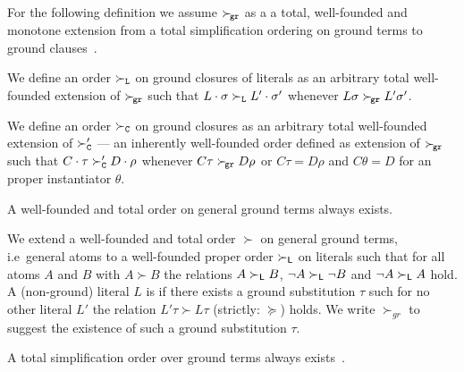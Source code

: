For the following definition we assume
\( \mathrel\succ_{\!\mathtt{gr}} \) as a a total, well-founded and monotone extension
from a total simplification ordering on ground terms
to ground clauses~\cite{NR2001}.

\begin{definition}
    We define an order \( \mathrel\succ_{\mathtt{L}} \) on ground closures of literals
    as an arbitrary total well-founded extension of \( \mathrel\succ_{\!\mathtt{gr}} \)
    such that
   \( L\cdot\sigma\mathrel\succ_{\mathtt{L}} L'\cdot\sigma' \) whenever
   \( L\sigma\mathrel\succ_{\!\mathtt{gr}} L'\sigma' \).

    We define an order \( \mathrel\succ_{\mathtt{C}} \) on ground closures
    as an arbitrary total well-founded extension of
   \( \mathrel\succ_{\mathtt{C}}' \) --- an inherently well-founded order defined as extension of \( \mathrel\succ_{\!\mathtt{gr}} \)
    such that
   \( C\cdot\tau\mathrel\succ_{\mathtt{C}}' D\cdot\rho \) whenever
   \( C\tau\mathrel\succ_{\!\mathtt{gr}} D\rho \) or \( C\tau = D\rho \) and \( C\theta = D \) for an proper instantiator \( \theta \).
\end{definition}

\begin{lemma}A well-founded and total order on general ground terms always exists.\end{lemma}

	\begin{definition}\label{def:orders-on-literals}
		We extend a well-founded and total order \( \succ \) on general ground terms,
		i.e~general atoms to a well-founded proper order \( \succ_{\mathsf{L}} \)
		on literals such that for all atoms \( A \) and \( B \) with \( A\succ B \)
		the relations \( A\succ_{\mathsf{L}} B \),
		\( \lnot A\succ_{\mathsf{L}}\lnot B \) and
		\( \lnot A\succ_{\mathsf{L}} A \) hold.
		A (non-ground) literal \( L \) is  if there exists a ground substitution \( \tau \)
		such for no other literal \( L' \) the relation \( L'\tau\succ L\tau \) (strictly: \( \succcurlyeq \)) holds.
		We write \( \succ_{gr} \) to suggest the existence of such a ground substitution \( \tau \).
	\end{definition}
%

%
\begin{lemma}
    A total simplification order
    over ground terms always exists~\cite{NR2001}.
\end{lemma}

